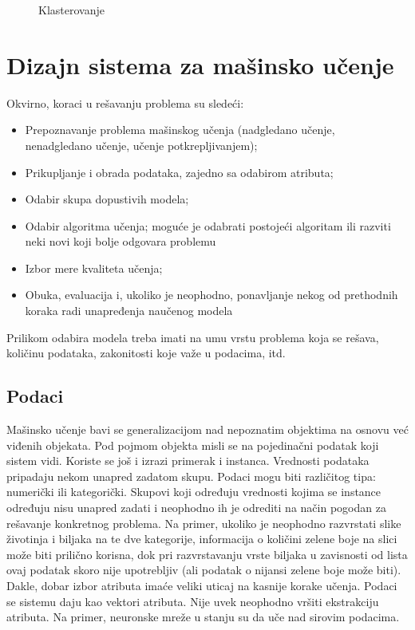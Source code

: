\begin{figure}
	\centering
	\resizebox{.8\linewidth}{!}{}
	\caption{Klasterovanje}
	\label{fig:klaster}
\end{figure}

\section{Dizajn sistema za mašinsko učenje}

Okvirno, koraci u rešavanju problema su sledeći:\cite{janicic_vi}
\begin{itemize}
	\item Prepoznavanje problema mašinskog učenja (nadgledano učenje, \\nenadgledano učenje, učenje potkrepljivanjem);
	\item Prikupljanje i obrada podataka, zajedno sa odabirom atributa;
	\item Odabir skupa dopustivih modela;
	\item Odabir algoritma učenja; moguće je odabrati postojeći algoritam ili razviti neki novi koji bolje odgovara problemu
	\item Izbor mere kvaliteta učenja;
	\item Obuka, evaluacija i, ukoliko je neophodno, ponavljanje nekog od prethodnih koraka radi unapređenja naučenog modela 
\end{itemize}

Prilikom odabira modela treba imati na umu vrstu problema koja se rešava, količinu podataka, zakonitosti koje važe u podacima, itd.


\subsection{Podaci}

Mašinsko učenje bavi se generalizacijom nad nepoznatim objektima na osnovu već viđenih objekata. Pod pojmom objekta misli se na pojedinačni podatak koji sistem vidi. Koriste se još i izrazi primerak i instanca. Vrednosti podataka pripadaju nekom unapred zadatom skupu. Podaci mogu biti različitog tipa: numerički ili kategorički. Skupovi koji određuju vrednosti kojima se instance određuju nisu unapred zadati i neophodno ih je odrediti na način pogodan za rešavanje konkretnog problema. Na primer, ukoliko je neophodno razvrstati slike životinja i biljaka na te dve kategorije, informacija o količini zelene boje na slici može biti prilično korisna, dok pri razvrstavanju vrste biljaka u zavisnosti od lista ovaj podatak skoro nije upotrebljiv (ali podatak o nijansi zelene boje može biti). Dakle, dobar izbor atributa imaće veliki uticaj na kasnije korake učenja. Podaci se sistemu daju kao vektori atributa. Nije uvek neophodno vršiti ekstrakciju atributa. Na primer, neuronske mreže u stanju su da uče nad sirovim podacima.
\par

